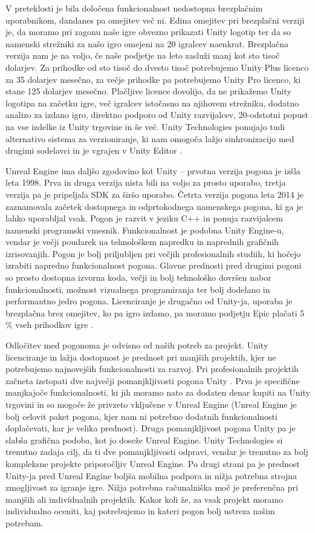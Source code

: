 \documentclass[12pt,a4paper,twoside]{book}
\begin{document}
V preteklosti je bila določena funkcionalnost nedostopna brezplačnim uporabnikom, dandanes pa omejitev več ni. Edina omejitev pri brezplačni verziji je, da moramo pri zagonu naše igre obvezno prikazati Unity logotip ter da so namenski strežniki za našo igro omejeni na 20 igralcev naenkrat. Brezplačna verzija nam je na voljo, če naše podjetje na leto zasluži manj kot sto tisoč dolarjev. Za prihodke od sto tisoč do dvesto tisoč potrebujemo Unity Plus licenco za 35 dolarjev mesečno, za večje prihodke pa potrebujemo Unity Pro licenco, ki stane 125 dolarjev mesečno. Plačljive licence dovolijo, da ne prikažemo Unity logotipa na začetku igre, več igralcev istočasno na njihovem strežniku, dodatno analizo za izdano igro, direktno podporo od Unity razvijalcev, 20-odstotni popust na vse izdelke iz Unity trgovine in še več. Unity Technologies ponujajo tudi alternativo sistema za verzioniranje, ki nam omogoča lažjo sinhronizacijo med drugimi sodelavci in je vgrajen v Unity Editor \cite{unityFeatures}.

Unreal Engine ima daljšo zgodovino kot Unity -- prvotna verzija pogona je izšla leta 1998. Prva in druga verzija nista bili na voljo za prosto uporabo, tretja verzija pa je pripeljala SDK za širšo uporabo. Četrta verzija pogona leta 2014 je zaznamovala začetek dostopnega in odprtokodnega namenskega pogona, ki ga je lahko uporabljal vsak. Pogon je razvit v jeziku C++ in ponuja razvijalcem namenski programski vmesnik. Funkcionalnost je podobna Unity Engine-u, vendar je večji poudarek na tehnološkem napredku in naprednih grafičnih izrisovanjih. Pogon je bolj priljubljen pri večjih profesionalnih studiih, ki hočejo izrabiti napredno funkcionalnost pogona. Glavne prednosti pred drugimi pogoni so prosto dostopna izvorna koda, večji in bolj tehnološko dovršen nabor funkcionalnosti, možnost vizualnega programiranja ter bolj dodelano in performantno jedro pogona. Licenciranje je drugačno od Unity-ja, uporaba je brezplačna brez omejitev, ko pa igro izdamo, pa moramo podjetju Epic plačati 5 \% vseh prihodkov igre \cite{unrealEngine}. 

Odločitev med pogonoma je odvisno od naših potreb za projekt. Unity licenciranje in lažja dostopnost je prednost pri manjših projektih, kjer ne potrebujemo najnovejših funkcionalnosti za razvoj. Pri profesionalnih projektih začneta izstopati dve največji pomanjkljivosti pogona Unity . Prva je specifične manjkajoče funkcionalnosti, ki jih moramo nato za dodaten denar kupiti na Unity trgovini in so mogoče že privzeto vključene v Unreal Engine (Unreal Engine je bolj celovit paket pogona, kjer nam ni potrebno dodatnih funkcionalnosti doplačevati, kar je velika prednost). Druga pomanjkljivost pogona Unity  pa je slabša grafična podoba, kot jo doseže Unreal Engine. Unity Technologies si trenutno zadaja cilj, da ti dve pomanjkljivosti odpravi, vendar je trenutno za bolj kompleksne projekte priporočljiv Unreal Engine. Po drugi strani pa je prednost Unity-ja pred Unreal Engine boljša mobilna podpora in nižja potrebna strojna zmogljivost za igranje igre. Nižja potrebna računalniška moč je preferenčna pri manjših ali individualnih projektih. Kakor koli že, za vsak projekt moramo individualno oceniti, kaj potrebujemo in kateri pogon bolj ustreza našim potrebam.
	
\end{document}
